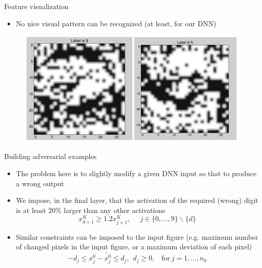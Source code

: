 \documentclass{beamer}
\begin{document}
\begin{frame}{Feature visualization}
    \begin{itemize}
        \item No nice visual pattern can be recognized (at least, for our DNN)
    \end{itemize}
  \begin{figure}
    \centering
    \includegraphics[width=0.9\columnwidth]{feature_visualization.png}
  \end{figure}
\end{frame}



\begin{frame}{Building adversarial examples}
  \begin{itemize}
  \item The problem here is to slightly modify a given DNN input so that to produce a wrong output
  \item We impose, in the final layer, that the activation of the required (wrong) digit is at least 20\% larger than any other activations
  $$x_{d+1}^{K} \geq 1.2 x_{j+1}^{K},\ \ \ \ \ \ j \in \{0, ..., 9 \} \backslash \{d \}$$
  \pause
  \item Similar constraints can be imposed to the input figure (e.g. maximum number of changed pixels in the input figure, or a maximum deviation of each pixel)
  $$-d_j \leq x_j^{0} - \widetilde{x_j^{0}} \leq d_j, \ \ d_j \geq 0, \ \ \ \ \mbox{for}\  j=1, ..., n_0$$
  \end{itemize}
\end{frame}
\end{document}
